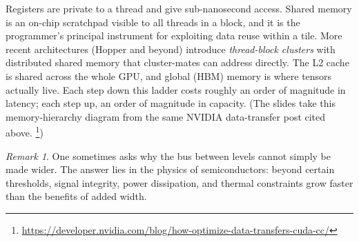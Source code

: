 \documentclass[11pt,a4paper]{article}
\theoremstyle{definition}
\theoremstyle{remark}
\newtheorem*{remark}{Remark}
\theoremstyle{plain}
\begin{document}
\begin{center}
\end{center}

Registers are private to a thread and give sub-nanosecond access.
Shared memory is an on-chip scratchpad visible to all threads in a
block, and it is the programmer's principal instrument for
exploiting data reuse within a tile. More recent architectures
(Hopper and beyond) introduce \emph{thread-block clusters} with
distributed shared memory that cluster-mates can address directly.
The L2 cache is shared across the whole GPU, and global (HBM) memory
is where tensors actually live. Each step down this ladder costs
roughly an order of magnitude in latency; each step up, an order of
magnitude in capacity. (The slides take this memory-hierarchy
diagram from the same NVIDIA data-transfer post cited above.%
\footnote{\url{https://developer.nvidia.com/blog/how-optimize-data-transfers-cuda-cc/}})

\begin{remark}
One sometimes asks why the bus between levels cannot simply be made
wider. The answer lies in the physics of semiconductors: beyond
certain thresholds, signal integrity, power dissipation, and
thermal constraints grow faster than the benefits of added width.
\end{remark}
\end{document}
